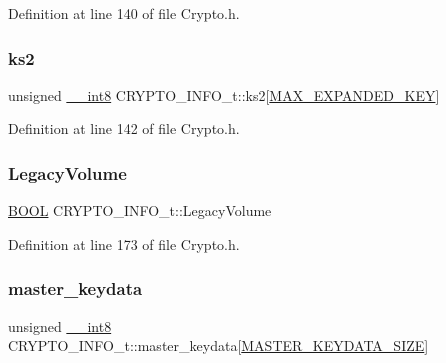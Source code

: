 Definition at line 140 of file Crypto.\+h.

\mbox{\label{struct_c_r_y_p_t_o___i_n_f_o__t_a5131a605efc7b27a6760dffbca062554}} 
\subsubsection{\texorpdfstring{ks2}{ks2}}
{\footnotesize\ttfamily unsigned \hyperlink{_gstdefs_8h_a040b30765a23a94d40af4f00f956c3a5}{\+\_\+\+\_\+int8} C\+R\+Y\+P\+T\+O\+\_\+\+I\+N\+F\+O\+\_\+t\+::ks2\mbox{[}\hyperlink{_crypto_8h_ada56882b07c27e391b81a014a85761ce}{M\+A\+X\+\_\+\+E\+X\+P\+A\+N\+D\+E\+D\+\_\+\+K\+EY}\mbox{]}}



Definition at line 142 of file Crypto.\+h.

\mbox{\label{struct_c_r_y_p_t_o___i_n_f_o__t_a9af407fb5ff31320aac48db51f18441e}} 
\subsubsection{\texorpdfstring{Legacy\+Volume}{LegacyVolume}}
{\footnotesize\ttfamily \hyperlink{_gstdefs_8h_ae4cc35dcc70810fa972cc8a5185a28fa}{B\+O\+OL} C\+R\+Y\+P\+T\+O\+\_\+\+I\+N\+F\+O\+\_\+t\+::\+Legacy\+Volume}



Definition at line 173 of file Crypto.\+h.

\mbox{\label{struct_c_r_y_p_t_o___i_n_f_o__t_a3ed5d4caeac87ba4b4153851985660fc}} 
\subsubsection{\texorpdfstring{master\+\_\+keydata}{master\_keydata}}
{\footnotesize\ttfamily unsigned \hyperlink{_gstdefs_8h_a040b30765a23a94d40af4f00f956c3a5}{\+\_\+\+\_\+int8} C\+R\+Y\+P\+T\+O\+\_\+\+I\+N\+F\+O\+\_\+t\+::master\+\_\+keydata\mbox{[}\hyperlink{_crypto_8h_a4f76a109cfa790caf13588bb8d8e24ca}{M\+A\+S\+T\+E\+R\+\_\+\+K\+E\+Y\+D\+A\+T\+A\+\_\+\+S\+I\+ZE}\mbox{]}}




